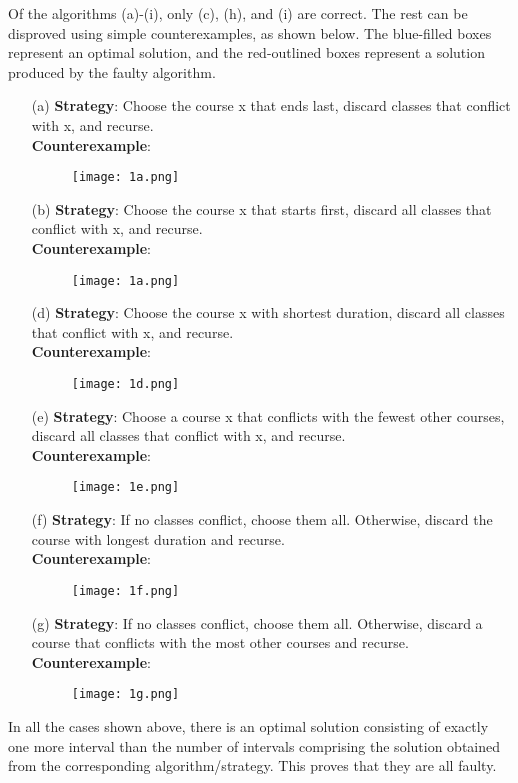\documentclass[11pt, fleqn]{article}
\begin{document}
Of the algorithms (a)-(i), only (c), (h), and (i) are correct. The rest can be disproved using simple counterexamples, as shown below. The blue-filled boxes represent an optimal solution, and the red-outlined boxes represent a solution produced by the faulty algorithm.
\begin{itemize}
    \item[(a)]
    \textbf{Strategy}: Choose the course x that ends last, discard classes that conflict with x, and recurse.\\
    \textbf{Counterexample}:
    \begin{figure}[H]
        \centering
        \texttt{[image: 1a.png]}
    \end{figure}
    \item[(b)]
    \textbf{Strategy}: Choose the course x that starts first, discard all classes that conflict with x, and recurse.\\
    \textbf{Counterexample}:
    \begin{figure}[H]
        \centering
        \texttt{[image: 1a.png]}
    \end{figure}
    \item[(d)]
    \textbf{Strategy}: Choose the course x with shortest duration, discard all classes that conflict with x, and recurse.\\
    \textbf{Counterexample}:
    \begin{figure}[H]
        \centering
        \texttt{[image: 1d.png]}
    \end{figure}
    \item[(e)]
    \textbf{Strategy}: Choose a course x that conflicts with the fewest other courses, discard all classes that conflict with x, and recurse.\\
    \textbf{Counterexample}:
    \begin{figure}[H]
        \centering
        \texttt{[image: 1e.png]}
    \end{figure}
    \item[(f)]
    \textbf{Strategy}: If no classes conflict, choose them all.  Otherwise, discard the course with longest duration and recurse.\\
    \textbf{Counterexample}:
    \begin{figure}[H]
        \centering
        \texttt{[image: 1f.png]}
    \end{figure}
    \item[(g)]
    \textbf{Strategy}: If no classes conflict, choose them all. Otherwise, discard a course that conflicts with the most other courses and recurse.\\
    \textbf{Counterexample}:
    \begin{figure}[H]
        \centering
        \texttt{[image: 1g.png]}
    \end{figure}
\end{itemize}
In all the cases shown above, there is an optimal solution consisting of exactly one more interval than the number of intervals comprising the solution obtained from the corresponding algorithm/strategy. This proves that they are all faulty.
\end{document}
